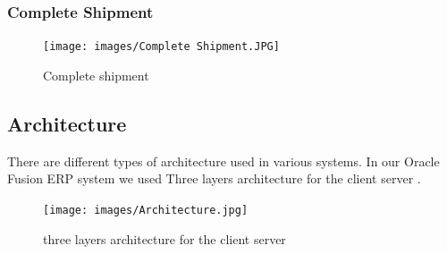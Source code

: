 \subsubsection{Complete Shipment}
\begin{figure} [H]
    \centering
    \texttt{[image: images/Complete Shipment.JPG]}
    \caption{Complete shipment}
    \label{fig:my_label}
\end{figure}    
\subsection{Architecture}

There are different types of architecture used in various systems. In our Oracle Fusion ERP system we used Three layers architecture for the client server \cite{chiu2003three}. 

\begin{figure} [H]
    \centering
    \texttt{[image: images/Architecture.jpg]}
    \caption{three layers architecture for the client server}
    \label{fig:my_label}
\end{figure} 

